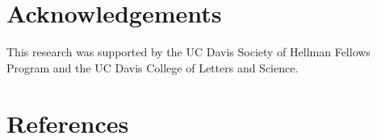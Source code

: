 \documentclass[10pt, letterpaper, hidelinks]{article}
\begin{document}
\hypertarget{acknowledgements}{%
\section{Acknowledgements}\label{acknowledgements}}

This research was supported by the UC Davis Society of Hellman Fellows
Program and the UC Davis College of Letters and Science.

\hypertarget{references}{%
\section{References}\label{references}}

\setlength{\parindent}{-0.1in} 
\setlength{\leftskip}{0.125in}

\noindent
\end{document}
